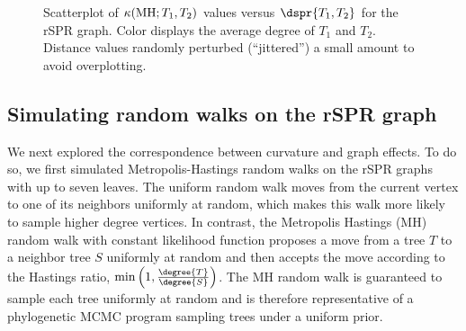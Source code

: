 \documentclass[11pt,onecolumn,conference]{IEEEtran}
\let\MYoriglatexcaption\caption
\renewcommand{\caption}[2][\relax]{\MYoriglatexcaption[#2]{#2}}
\newcommand{\MH}{\operatorname{MH}}
\newcommand{\curvature}[2][]{%
    \ifthenelse{\equal{#1}{}}%
		{\kappa(#2)}%
		{\kappa_{#1}(#2)}%
}
\begin{document}
\begin{figure}
    \caption{Scatterplot of $\curvature{\MH; T_1,T_2}$ values versus $\dspr{T_1,T_2}$ for the rSPR graph. Color displays the average degree of $T_1$ and $T_2$. Distance values randomly perturbed (``jittered'') a small amount to avoid overplotting.}
	\label{fig:rspr-scatter}
\end{figure}

\subsection{Simulating random walks on the rSPR graph}
\label{sec:random_walks}
We next explored the correspondence between curvature and graph effects.
To do so, we first simulated Metropolis-Hastings random walks on the rSPR graphs with up to seven leaves.
The uniform random walk moves from the current vertex to one of its neighbors uniformly at random, which makes this walk more likely to sample higher degree vertices.
In contrast, the Metropolis Hastings (MH) random walk with constant likelihood function proposes a move from a tree $T$ to a neighbor tree $S$ uniformly at random and then accepts the move according to the Hastings ratio, $\min\left(1, \frac{\degree{T}}{\degree{S}}\right)$.
The MH random walk is guaranteed to sample each tree uniformly at random and is therefore representative of a phylogenetic MCMC program sampling trees under a uniform prior.
\end{document}
